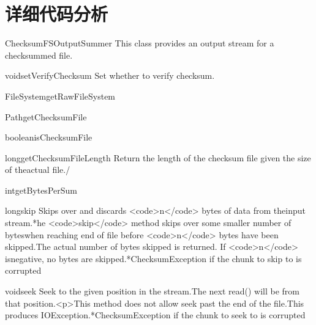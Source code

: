 \chapter{详细代码分析}
\label{ch:src}



\begin{XeClass}{ChecksumFSOutputSummer}
This class provides an output stream for a checksummed file.
    \begin{XeMethod}{\XePublic}{void}{setVerifyChecksum}
        Set whether to verify checksum.
    \end{XeMethod}

    \begin{XeMethod}{\XePublic}{FileSystem}{getRawFileSystem}
        
    \end{XeMethod}

    \begin{XeMethod}{\XePublic}{Path}{getChecksumFile}
        
    \end{XeMethod}

    \begin{XeMethod}{\XePublic}{boolean}{isChecksumFile}
        
    \end{XeMethod}

    \begin{XeMethod}{\XePublic}{long}{getChecksumFileLength}
        Return the length of the checksum file given the size of theactual file./
    \end{XeMethod}

    \begin{XeMethod}{\XePublic}{int}{getBytesPerSum}
        
    \end{XeMethod}

    \begin{XeMethod}{\XePublic}{long}{skip}
        Skips over and discards <code>n</code> bytes of data from theinput stream.*he <code>skip</code> method skips over some smaller number of byteswhen reaching end of file before <code>n</code> bytes have been skipped.The actual number of bytes skipped is returned.  If <code>n</code> isnegative, no bytes are skipped.*ChecksumException if the chunk to skip to is corrupted
    \end{XeMethod}

    \begin{XeMethod}{\XePublic}{void}{seek}
        Seek to the given position in the stream.The next read() will be from that position.<p>This method does not allow seek past the end of the file.This produces IOException.*ChecksumException if the chunk to seek to is corrupted
    \end{XeMethod}


\end{XeClass}
